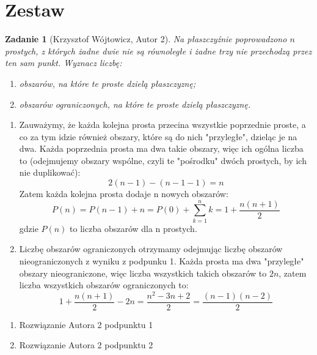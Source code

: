 \documentclass{mwart}
\newtheorem{zad}{Zadanie}[section]
\begin{document}
\section{Zestaw}              %
\begin{zad}[Krzysztof Wójtowicz, Autor 2]
    Na płaszczyźnie poprowadzono $n$ prostych, z których żadne dwie nie
    są równoległe i żadne trzy nie przechodzą przez ten sam punkt.
    Wyznacz liczbę:
    \begin{enumerate}
        \item obszarów, na które te proste dzielą płaszczyznę;
        \item obszarów ograniczonych, na które te proste dzielą płaszczyznę.
    \end{enumerate}
\end{zad}
\begin{mdframed}
    \begin{enumerate}
        \item Zauważymy, że każda kolejna prosta przecina wszystkie poprzednie proste,
              a co za tym idzie również obszary, które są do nich "przyległe", dzieląc je na
              dwa. Każda poprzednia prosta ma dwa takie obszary, więc ich ogólna liczba to
              (odejmujemy obszary wspólne, czyli te "pośrodku" dwóch prostych, by ich nie duplikować):
              \[2(n-1) - (n-1-1) = n\] Zatem każda kolejna prosta dodaje n nowych obszarów:
              \[P(n) = P(n-1) + n = P(0) + \sum_{k=1}^{n} k = 1 + \frac{n(n+1)}{2}\]
              gdzie $P(n)$ to liczba obszarów dla n prostych.
              \newline
        \item Liczbę obszarów ograniczonych otrzymamy odejmując liczbę obszarów nieograniczonych z wyniku z podpunku 1.
              Każda prosta ma dwa "przyległe" obszary nieograniczone, więc liczba wszystkich takich obszarów to $2n$,
              zatem liczba wszystkich obszarów ograniczonych to:
              \[1 + \frac{n(n+1)}{2} - 2n = \frac{n^2 - 3n + 2}{2} = \frac{(n-1)(n-2)}{2}\]
    \end{enumerate}
\end{mdframed}
\begin{mdframed}
    \begin{enumerate}
        \item Rozwiązanie Autora 2 podpunktu 1
        \item Rozwiązanie Autora 2 podpunktu 2
    \end{enumerate}
\end{mdframed}
\end{document}

